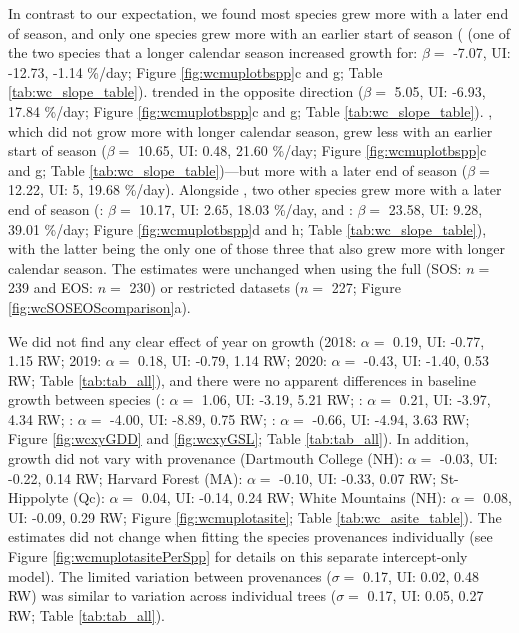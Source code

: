 In contrast to our expectation, we found most species grew more with a later end of season, and only one species grew more with an earlier start of season ({\Ainc} (one of the two species that a longer calendar season increased growth for: $\beta =$
-7.07, UI:
-12.73, 
-1.14 \%/day; Figure \ref{fig:wcmuplotbspp}c and g; Table \ref{tab:wc_slope_table}). 
{\Bpop} trended in the opposite direction ($\beta =$
5.05, UI:
-6.93, 
17.84 \%/day; Figure \ref{fig:wcmuplotbspp}c and g; Table \ref{tab:wc_slope_table}). {\Ball}, which did not grow more with longer calendar season, grew less with an earlier start of season ($\beta =$
10.65, UI:
0.48, 
21.60 \%/day; Figure \ref{fig:wcmuplotbspp}c and g; Table \ref{tab:wc_slope_table})---but more with a later end of season ($\beta =$ 
12.22, UI:
5, 
19.68 \%/day). Alongside {\Ball}, two other species grew more with a later end of season ({\Bpop}: $\beta =$
10.17, UI:
2.65, 
18.03 \%/day, and {\Bpap}: $\beta =$
23.58, UI:
9.28, 
39.01 \%/day; Figure \ref{fig:wcmuplotbspp}d and h; Table \ref{tab:wc_slope_table}), with the latter being the only one of those three that also grew more with longer calendar season. The estimates were unchanged when using the full (SOS: $n =$
239 and EOS: $n =$
230) or restricted datasets ($n =$ 
227; Figure \ref{fig:wcSOSEOScomparison}a). 


We did not find any clear effect of year on growth (2018: $\alpha =$
0.19, UI:
-0.77, 
1.15 RW; 2019: $\alpha =$
0.18, UI:
-0.79, 
1.14 RW; 2020: $\alpha =$
-0.43, UI:
-1.40, 
0.53 RW; Table \ref{tab:tab_all}), and there were no apparent differences in baseline growth between species ({\Ainc}: $\alpha =$
1.06, UI:
-3.19, 
5.21 RW; {\Ball}: $\alpha =$
0.21, UI:
-3.97, 
4.34 RW; {\Bpap}: $\alpha =$
-4.00, UI:
-8.89, 
0.75 RW; {\Bpop}: $\alpha =$
-0.66, UI:
-4.94, 
3.63 RW; Figure \ref{fig:wcxyGDD} and \ref{fig:wcxyGSL}; Table \ref{tab:tab_all}). In addition, growth did not vary with provenance (Dartmouth College (NH): $\alpha =$
-0.03, UI:
-0.22, 
0.14 RW; Harvard Forest (MA): $\alpha =$
-0.10, UI:
-0.33, 
0.07 RW; St-Hippolyte (Qc): $\alpha =$
0.04, UI:
-0.14, 
0.24 RW; White Mountains (NH): $\alpha =$
0.08, UI:
-0.09, 
0.29 RW; Figure \ref{fig:wcmuplotasite}; Table \ref{tab:wc_asite_table}). The estimates did not change when fitting the species provenances individually (see Figure \ref{fig:wcmuplotasitePerSpp} for details on this separate intercept-only model). The limited variation between provenances ($\sigma = $
0.17, UI:
0.02, 
0.48 RW) was similar to variation across individual trees ($\sigma =$ 
0.17, UI: 
0.05, 
0.27 RW; Table \ref{tab:tab_all}).



